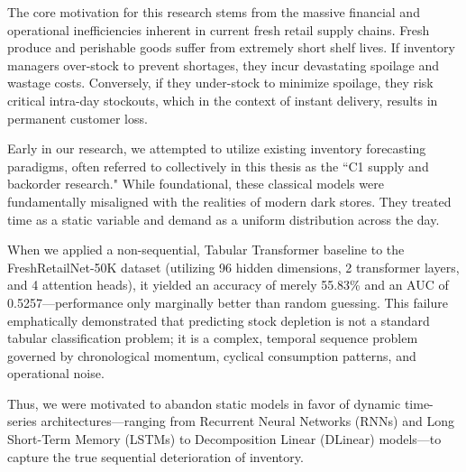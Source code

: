 The core motivation for this research stems from the massive financial and operational inefficiencies inherent in current fresh retail supply chains. Fresh produce and perishable goods suffer from extremely short shelf lives. If inventory managers over-stock to prevent shortages, they incur devastating spoilage and wastage costs. Conversely, if they under-stock to minimize spoilage, they risk critical intra-day stockouts, which in the context of instant delivery, results in permanent customer loss.

Early in our research, we attempted to utilize existing inventory forecasting paradigms, often referred to collectively in this thesis as the ``C1 supply and backorder research." While foundational, these classical models were fundamentally misaligned with the realities of modern dark stores. They treated time as a static variable and demand as a uniform distribution across the day. 

When we applied a non-sequential, Tabular Transformer baseline to the FreshRetailNet-50K dataset (utilizing 96 hidden dimensions, 2 transformer layers, and 4 attention heads), it yielded an accuracy of merely 55.83\% and an AUC of 0.5257—performance only marginally better than random guessing. This failure emphatically demonstrated that predicting stock depletion is not a standard tabular classification problem; it is a complex, temporal sequence problem governed by chronological momentum, cyclical consumption patterns, and operational noise.

Thus, we were motivated to abandon static models in favor of dynamic time-series architectures—ranging from Recurrent Neural Networks (RNNs) and Long Short-Term Memory (LSTMs) to Decomposition Linear (DLinear) models—to capture the true sequential deterioration of inventory.


